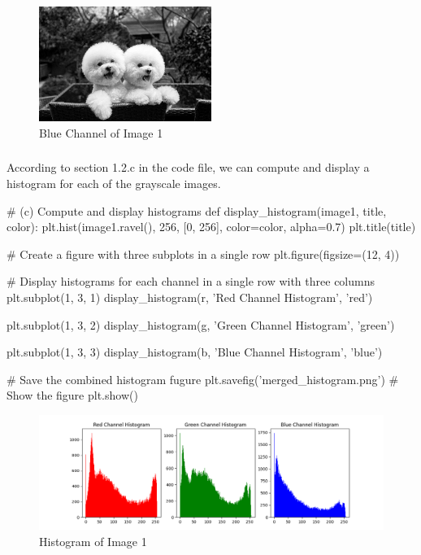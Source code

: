 \documentclass[12pt]{article}
\begin{document}
\begin{figure}[H]
  \centering
  \includegraphics[width=0.5\textwidth]{blue_channel.jpg}
  \caption{Blue Channel of Image 1}
  \label{fig:example}
\end{figure}

\subsubsection{}
\quad According to section 1.2.c in the code file, we can compute and display a histogram for each of the grayscale images.
\begin{python}
  # (c) Compute and display histograms
  def display_histogram(image1, title, color):
  plt.hist(image1.ravel(), 256, [0, 256], color=color, alpha=0.7)
  plt.title(title)

  # Create a figure with three subplots in a single row
  plt.figure(figsize=(12, 4))

  # Display histograms for each channel in a single row with three columns
  plt.subplot(1, 3, 1)
  display_histogram(r, 'Red Channel Histogram', 'red')

  plt.subplot(1, 3, 2)
  display_histogram(g, 'Green Channel Histogram', 'green')

  plt.subplot(1, 3, 3)
  display_histogram(b, 'Blue Channel Histogram', 'blue')

  # Save the combined histogram fugure
  plt.savefig('merged_histogram.png')
  # Show the figure
  plt.show()
\end{python}

\begin{figure}[H]
  \centering
  \includegraphics[width=1.0\textwidth]{merged_histogram.png}
  \caption{Histogram of Image 1}
  \label{fig:example}
\end{figure}
\end{document}
